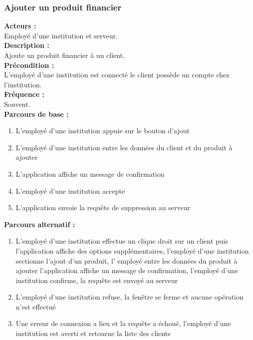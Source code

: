 \documentclass[../rapport.tex]{subfiles}
\begin{document}
\subsubsection{Ajouter un produit financier}

\textbf{Acteurs :} \\
Employé d'une institution et serveur. \\

\textbf{Description :} \\
Ajoute un produit financier à un client. \\

\textbf{Précondition :} \\
L’employé d’une institution est connecté le client possède un compte chez l’institution. \\

\textbf{Fréquence :} \\
Souvent. \\

\textbf{Parcours de base :} \\
\begin{enumerate}
    \item L’employé d’une institution appuie sur le bouton d’ajout
    \item L’employé d’une institution entre les données du client et du produit à ajouter
    \item L’application affiche un message de confirmation
    \item L’employé d’une institution accepte
    \item L’application envoie la requête de suppression au serveur
\end{enumerate}
\bigskip

\textbf{Parcours alternatif :}
\begin{enumerate}
    \item L’employé d’une institution effectue un clique droit sur un client puis l’application affiche des options supplémentaires, l’employé d’une institution sectionne l’ajout d’un produit, l’ employé entre les données du produit à ajouter l’application affiche un message de confirmation, l’employé d’une institution confirme, la requête est envoyé au serveur
    \item L’employé d’une institution refuse, la fenêtre se ferme et aucune opération n’est effectué
    \item Une erreur de connexion a lieu et la requête a échoué, l’employé d’une institution est averti et retourne la liste des clients
\end{enumerate}
\end{document}
